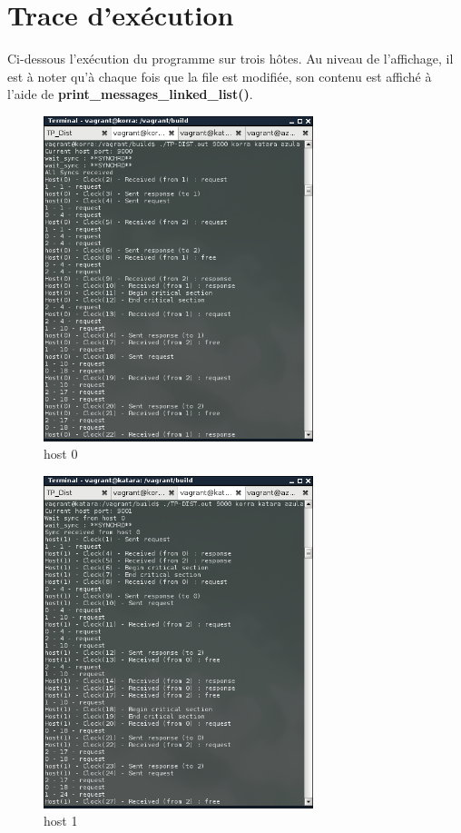 \section{Trace d'exécution}
Ci-dessous l'exécution du programme sur trois hôtes. Au niveau de l'affichage, il est à noter qu'à chaque fois que la file est modifiée, son contenu est affiché à l'aide de \textbf{print\_messages\_linked\_list()}.

\begin{figure}[h!]
    \centering
    \includegraphics[width=0.7\textwidth]{screenshots/h0_korra.png}
    \caption{host 0}
\end{figure}%

\begin{figure}[h!]
    \centering
    \includegraphics[width=0.7\textwidth]{screenshots/h1_katara.png}
    \caption{host 1}
\end{figure}

